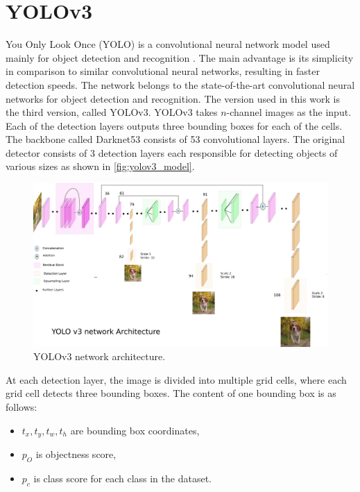\documentclass[twoside]{ctuthesis}
\theoremstyle{plain}
\theoremstyle{definition}
\theoremstyle{note}
\begin{document}
\section{YOLOv3} \label{s:2.2}
You Only Look Once (YOLO) is a convolutional neural network model used mainly for object detection and recognition \cite{redmon2016look}. The main advantage is its simplicity in comparison to similar convolutional neural networks, resulting in faster detection speeds. The network belongs to the state-of-the-art convolutional neural networks for object detection and recognition. The version used in this work is the third version, called YOLOv3\cite{redmon2018yolov3}. YOLOv3 takes $n$-channel images as the input. Each of the detection layers outputs three bounding boxes for each of the cells. The backbone called Darknet53 consists of 53 convolutional layers. The original detector consists of 3 detection layers each responsible for detecting objects of various sizes as shown in \autoref{fig:yolov3_model}. 
\begin{figure}
	\centering
	\includegraphics[width=\textwidth]{yolov3_model.png}
	\caption[YOLOv3 network architecture.]{YOLOv3 network architecture\footnotemark.}
	\label{fig:yolov3_model}
\end{figure}
At each detection layer, the image is divided into multiple grid cells, where each grid cell detects three bounding boxes. The content of one bounding box is as follows:
\begin{itemize}
	\item $t_x, t_y, t_w, t_h$ are bounding box coordinates,
	\item $p_O$ is objectness score,
	\item $p_c$ is class score for each class in the dataset.
\end{itemize}
\end{document}
